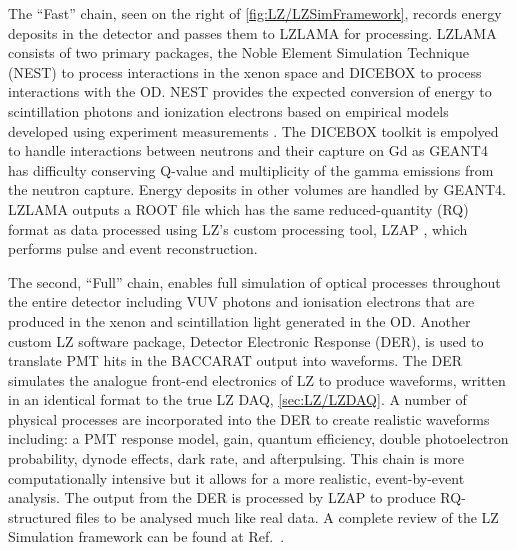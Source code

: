 The ``Fast'' chain, seen on the right of \autoref{fig:LZ/LZSimFramework}, records energy deposits in the detector and passes them to LZLAMA for processing. LZLAMA consists of two primary packages, the Noble Element Simulation Technique (NEST) to process interactions in the xenon space and DICEBOX to process interactions with the OD. NEST provides the expected conversion of energy to scintillation photons and ionization electrons based on empirical models developed using experiment measurements \cite{NEST1}. The DICEBOX toolkit is empolyed to handle interactions between neutrons and their capture on Gd as GEANT4 has difficulty conserving Q-value and multiplicity of the gamma emissions from the neutron capture. Energy deposits in other volumes are handled by GEANT4. LZLAMA outputs a ROOT file which has the same reduced-quantity (RQ) format as data processed using LZ's custom processing tool, LZAP \cite{LZ_SIMS}, which performs pulse and event reconstruction.

The second, ``Full'' chain, enables full simulation of optical processes throughout the entire detector including VUV photons and ionisation electrons that are produced in the xenon and scintillation light generated in the OD. Another custom LZ software package, Detector Electronic Response (DER), is used to translate PMT hits in the BACCARAT output into waveforms. The DER simulates the analogue front-end electronics of LZ to produce waveforms, written in an identical format to the true LZ DAQ, \autoref{sec:LZ/LZDAQ}. A number of physical processes are incorporated into the DER to create realistic waveforms including: a PMT response model, gain, quantum efficiency, double photoelectron probability, dynode effects, dark rate, and afterpulsing. This chain is more computationally intensive but it allows for a more realistic, event-by-event analysis. The output from the DER is processed by LZAP to produce RQ-structured files to be analysed much like real data.
A complete review of the LZ Simulation framework can be found at Ref.~\cite{LZ_SIMS}.

